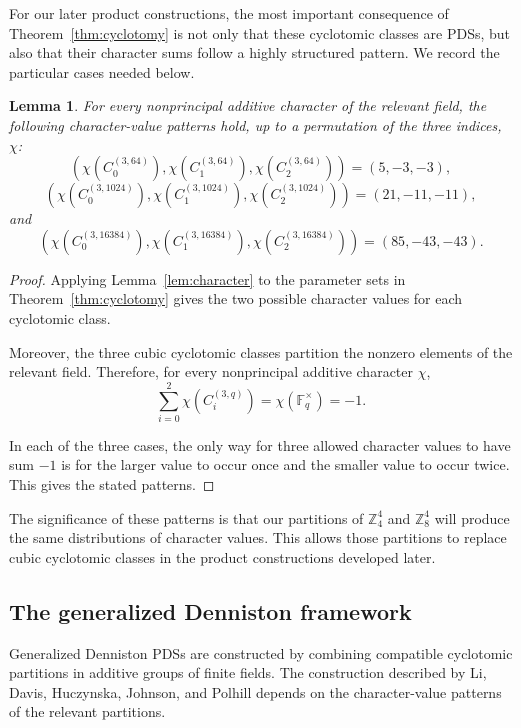 \documentclass[11pt]{article}
\newtheorem{lemma}[theorem]{Lemma}
\theoremstyle{definition}
\theoremstyle{remark}
\newcommand{\F}{\mathbb{F}}
\newcommand{\Z}{\mathbb{Z}}
\begin{document}
For our later product constructions, the most important consequence
of Theorem~\ref{thm:cyclotomy} is not only that these cyclotomic
classes are PDSs, but also that their character sums follow a highly
structured pattern. We record the particular cases needed below.

\begin{lemma}
\label{lem:cyclotomic-character-patterns}
For every nonprincipal additive character of the relevant field, the
following character-value patterns hold, up to a permutation of the
three indices, $\chi$:
\[
\left(
\chi(C_0^{(3,64)}),
\chi(C_1^{(3,64)}),
\chi(C_2^{(3,64)})
\right)
=
(5,-3,-3),
\]
\[
\left(
\chi(C_0^{(3,1024)}),
\chi(C_1^{(3,1024)}),
\chi(C_2^{(3,1024)})
\right)
=
(21,-11,-11),
\]
and
\[
\left(
\chi(C_0^{(3,16384)}),
\chi(C_1^{(3,16384)}),
\chi(C_2^{(3,16384)})
\right)
=
(85,-43,-43).
\]
\end{lemma}

\begin{proof}
Applying Lemma~\ref{lem:character} to the parameter sets in
Theorem~\ref{thm:cyclotomy} gives the two possible character values
for each cyclotomic class.

Moreover, the three cubic cyclotomic classes partition the nonzero
elements of the relevant field. Therefore, for every nonprincipal
additive character \(\chi\),
\[
\sum_{i=0}^{2}\chi\left(C_i^{(3,q)}\right)
=
\chi(\F_q^\times)
=
-1.
\]

In each of the three cases, the only way for three allowed character
values to have sum \(-1\) is for the larger value to occur once and
the smaller value to occur twice. This gives the stated patterns.
\end{proof}

The significance of these patterns is that our partitions of
\(\Z_4^4\) and \(\Z_8^4\) will produce the same distributions of
character values. This allows those partitions to replace cubic
cyclotomic classes in the product constructions developed later.



\subsection{The generalized Denniston framework}

Generalized Denniston PDSs are constructed by
combining compatible cyclotomic partitions in additive groups of
finite fields. The construction described by Li, Davis, Huczynska,
Johnson, and Polhill \cite{GenDennPaper} depends on the character-value
patterns of the relevant partitions.
\end{document}

